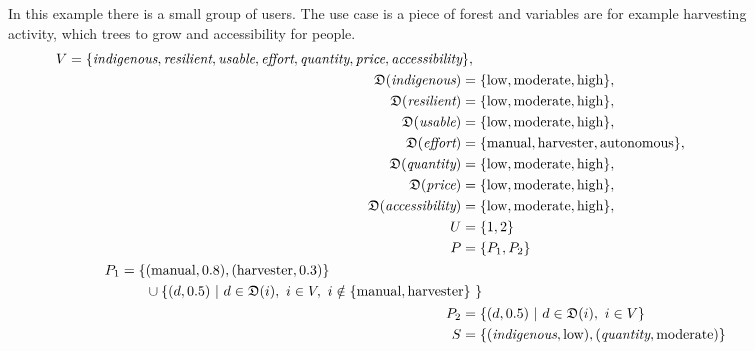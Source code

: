 \begin{figure}
    \begin{mdframed}[frametitle={Example for Forest Use Case}, linecolor=black, frametitlerulecolor=black, frametitlebackgroundcolor=gray!5]
        In this example there is a small group of users. The use case is a piece of forest and variables are for example harvesting activity, which trees to grow and accessibility for people.
        \begin{align}
            \begin{split}
                V = \{ & \textit{indigenous}, \textit{resilient}, \textit{usable}, \textit{effort}, \textit{quantity}, \textit{price}, \textit{accessibility} \},
            \end{split} \notag \\
            \mathfrak{D}(\textit{indigenous}) =  \{ & \text{low}, \text{moderate}, \text{high}\}, \notag \\
            \mathfrak{D}(\textit{resilient}) = \{ & \text{low}, \text{moderate}, \text{high}\}, \notag \\
            \mathfrak{D}(\textit{usable}) = \{ & \text{low}, \text{moderate}, \text{high}\}, \notag \\
            \mathfrak{D}(\textit{effort}) = \{ & \text{manual}, \text{harvester}, \text{autonomous}\}, \notag \\
            \mathfrak{D}(\textit{quantity}) = \{ & \text{low}, \text{moderate}, \text{high}\}, \notag \\
            \mathfrak{D}(\textit{price}) = \{ & \text{low}, \text{moderate}, \text{high}\}, \notag\\
            \mathfrak{D}(\textit{accessibility}) = \{ & \text{low}, \text{moderate}, \text{high}\},\notag \\
            U = \{ & 1,2\} \notag\\
            P = \{ & P_1, P_2\} \notag\\
            \begin{split}
                P_1 = \{ & (\text{manual}, 0.8), (\text{harvester}, 0.3) \} \\ 
                & \cup \{ (d,0.5)\ |\ d \in \mathfrak{D}(i),\ i \in V,\ i \notin \{ \text{manual}, \text{harvester}\} \ \} \ 
            \end{split} \notag \\
            P_2 = \{ & (d,0.5)\ |\ d \in \mathfrak{D}(i),\ i \in V \} \notag \\
            S  =  \{ & (\textit{indigenous}, \text{low}), (\textit{quantity}, \text{moderate}) \} \notag \\

\end{align}
\end{mdframed}
\end{figure}
